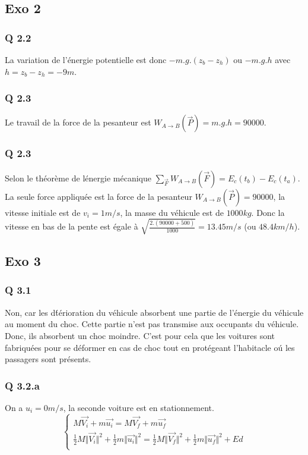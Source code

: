 \documentclass[]{book}
\theoremstyle{definition}
\begin{document}
\subsection*{Exo 2}
\subsubsection*{Q 2.2}
La variation de l'\'energie potentielle est donc $-m.g.(z_b - z_h)$ ou $-m.g.h$ avec $h = z_b - z_h = -9m$.

\subsubsection*{Q 2.3}
Le travail de la force de la pesanteur est $W_{A \to B}(\overrightarrow{P})= m.g.h = 90000$.

\subsubsection*{Q 2.3}
Selon le th\'eor\`eme de l\'energie m\'ecanique $\sum_{\overrightarrow{F}}W_{A \to B}(\overrightarrow{F}) = E_c(t_b) - E_c(t_a)$.
La seule force appliqu\'ee est la force de la pesanteur $W_{A \to B}(\overrightarrow{P})= 90000$, la vitesse initiale est de $v_i = 1m/s$, la masse du v\'ehicule est de $1000kg$. Donc la vitesse en bas de la pente est \'egale \`a $\sqrt{\frac{2.(90000+500)}{1000}} = 13.45m/s$ (ou $48.4km/h$).

\subsection*{Exo 3}
\subsubsection*{Q 3.1}
Non, car les d\'t\'erioration du v\'ehicule absorbent une partie de l'\'energie du v\'ehicule au moment du choc. Cette partie n'est pas transmise aux occupants du v\'ehicule. Donc, ils absorbent un choc moindre. C'est pour cela que les voitures sont fabriqu\'ees pour se d\'eformer en cas de choc tout en prot\'egeant l'habitacle o\'u les passagers sont pr\'esents.

\subsubsection*{Q 3.2.a}
On a $u_i = 0m/s$, la seconde voiture est en stationnement.
$$
\left\{ 
\begin{array}{l}
 M\overrightarrow{V_i} + m\overrightarrow{u_i} = M\overrightarrow{V_f} + m\overrightarrow{u_f} \\
 \frac{1}{2}M\Vert \overrightarrow{V_i} \Vert^2 + \frac{1}{2}m\Vert \overrightarrow{u_i} \Vert^2 = \frac{1}{2}M\Vert \overrightarrow{V_f} \Vert^2 + \frac{1}{2}m\Vert \overrightarrow{u_f} \Vert^2 + Ed\\
\end{array}
\right. 
$$
\end{document}
